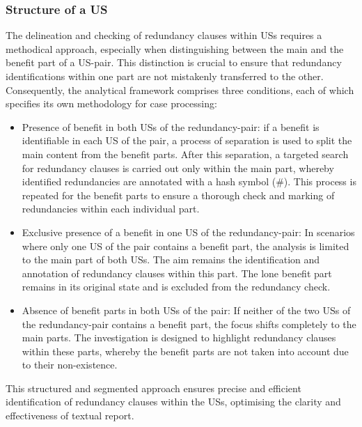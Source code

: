 \subsubsection*{Structure of a US}
The delineation and checking of redundancy clauses within USs requires a methodical approach, especially when distinguishing between the main and the benefit part of a US-pair. This distinction is crucial to ensure that redundancy identifications within one part are not mistakenly transferred to the other. Consequently, the analytical framework comprises three conditions, each of which specifies its own methodology for case processing:
\begin{itemize}
	\item Presence of benefit in both USs of the redundancy-pair: if a benefit is identifiable in each US of the pair, a process of separation is used to split the main content from the benefit parts. After this separation, a targeted search for redundancy clauses is carried out only within the main part, whereby identified redundancies are annotated with a hash symbol (\#). This process is repeated for the benefit parts to ensure a thorough check and marking of redundancies within each individual part.
	
	\item Exclusive presence of a benefit in one US of the redundancy-pair: In scenarios where only one US of the pair contains a benefit part, the analysis is limited to the main part of both USs. The aim remains the identification and annotation of redundancy clauses within this part. The lone benefit part remains in its original state and is excluded from the redundancy check.
	
	\item Absence of benefit parts in both USs of the pair: If neither of the two USs of the redundancy-pair contains a benefit part, the focus shifts completely to the main parts. The investigation is designed to highlight redundancy clauses within these parts, whereby the benefit parts are not taken into account due to their non-existence.
	
\end{itemize}
This structured and segmented approach ensures precise and efficient identification of redundancy clauses within the USs, optimising the clarity and effectiveness of textual report.




